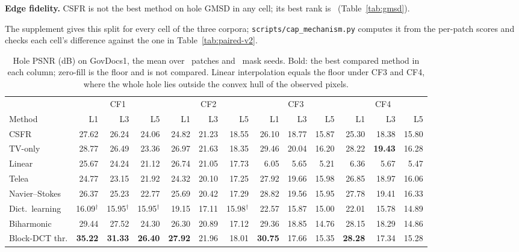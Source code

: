 \documentclass[final,3p]{elsarticle}
\begin{document}
\textbf{Edge fidelity.} CSFR is not the best method on hole GMSD in any cell; its best rank is \qGovGmsdRankMin\ (Table~\ref{tab:gmsd}).

The supplement gives this split for every cell of the three corpora; \texttt{scripts/\allowbreak cap\allowbreak\_mechanism.py} computes it from the per-patch scores and checks each cell's difference against the one in Table~\ref{tab:paired-v2}.

\begin{table}[!t]
\centering
\caption{Hole PSNR (dB) on GovDocs1, the mean over \corpusGovN\ patches and \sweepSeeds\ mask seeds. Bold: the best compared method in each column; zero-fill is the floor and is not compared. Linear interpolation equals the floor under CF3 and CF4, where the whole hole lies outside the convex hull of the observed pixels.}
\label{tab:quality}
\footnotesize
\setlength{\tabcolsep}{3.5pt}
\begin{tabular}{@{}l*{12}{r}@{}}
\toprule
 & \multicolumn{3}{c}{CF1} & \multicolumn{3}{c}{CF2} & \multicolumn{3}{c}{CF3} & \multicolumn{3}{c}{CF4} \\
\cmidrule(lr){2-4}\cmidrule(lr){5-7}\cmidrule(lr){8-10}\cmidrule(l){11-13}
Method & L1 & L3 & L5 & L1 & L3 & L5 & L1 & L3 & L5 & L1 & L3 & L5 \\
\midrule
CSFR & 27.62 & 26.24 & 24.06 & 24.82 & 21.23 & 18.55 & 26.10 & 18.77 & 15.87 & 25.30 & 18.38 & 15.80 \\
TV-only & 28.77 & 26.49 & 23.36 & 26.97 & 21.63 & 18.35 & 29.46 & 20.04 & 16.20 & 28.22 & \textbf{19.43} & 16.28 \\
Linear & 25.67 & 24.24 & 21.12 & 26.74 & 21.05 & 17.73 & 6.05 & 5.65 & 5.21 & 6.36 & 5.67 & 5.47 \\
Telea & 24.77 & 23.15 & 21.92 & 24.32 & 20.10 & 17.25 & 27.92 & 19.66 & 15.98 & 26.85 & 18.97 & 16.06 \\
Navier--Stokes & 26.37 & 25.23 & 22.77 & 25.69 & 20.42 & 17.29 & 28.82 & 19.56 & 15.95 & 27.78 & 19.41 & 16.33 \\
Dict.\ learning & 16.09$^{\dagger}$ & 15.95$^{\dagger}$ & 15.95$^{\dagger}$ & 19.15 & 17.11 & 15.98$^{\dagger}$ & 22.57 & 15.87 & 15.00 & 22.01 & 15.78 & 14.89 \\
Biharmonic & 29.44 & 27.52 & 24.30 & 26.30 & 20.89 & 17.12 & 29.36 & 18.85 & 14.76 & 28.15 & 18.29 & 14.86 \\
Block-DCT thr. & \textbf{35.22} & \textbf{31.33} & \textbf{26.40} & \textbf{27.92} & 21.96 & 18.01 & \textbf{30.75} & 17.66 & 15.35 & \textbf{28.28} & 17.34 & 15.28 \\

\end{tabular}
\end{table}
\end{document}
